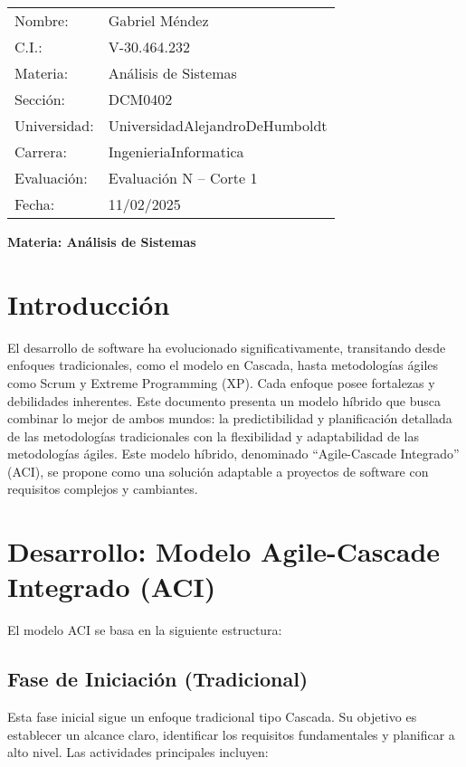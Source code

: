 \documentclass[12pt, spanish]{article}
\begin{document}
\begin{tabular}{ll}
Nombre: & Gabriel Méndez \\
C.I.: & V-30.464.232 \\
Materia: & Análisis de Sistemas \\
Sección: & DCM0402 \\
Universidad: & UniversidadAlejandroDeHumboldt \\
Carrera: & IngenieriaInformatica \\
Evaluación: & Evaluación N\textdegree1 – Corte 1 \\
Fecha: & 11/02/2025
\end{tabular}

\vspace{2cm}
\begin{center}
\Large \textbf{{Materia: Análisis de Sistemas}}
\end{center}

\section*{Introducción}

El desarrollo de software ha evolucionado significativamente, transitando desde enfoques tradicionales, como el modelo en Cascada, hasta metodologías ágiles como Scrum y Extreme Programming (XP). Cada enfoque posee fortalezas y debilidades inherentes. Este documento presenta un modelo híbrido que busca combinar lo mejor de ambos mundos: la predictibilidad y planificación detallada de las metodologías tradicionales con la flexibilidad y adaptabilidad de las metodologías ágiles. Este modelo híbrido, denominado “Agile-Cascade Integrado” (ACI), se propone como una solución adaptable a proyectos de software con requisitos complejos y cambiantes.

\section*{Desarrollo: Modelo Agile-Cascade Integrado (ACI)}

El modelo ACI se basa en la siguiente estructura:

\subsection*{Fase de Iniciación (Tradicional)}

Esta fase inicial sigue un enfoque tradicional tipo Cascada. Su objetivo es establecer un alcance claro, identificar los requisitos fundamentales y planificar a alto nivel. Las actividades principales incluyen:
\end{document}
